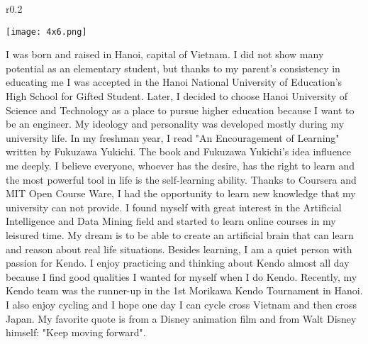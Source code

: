 \documentclass[letterpaper,11pt]{article}
\begin{document}
\begin{minipage}{\textwidth}
\begin{wrapfigure}{r}{0.2\textwidth}
  \vspace{-13pt}
  \begin{center}
    \texttt{[image: 4x6.png]}
  \end{center}
  \vspace{-20pt}
\end{wrapfigure}
\vspace{1em}
I was born and raised in Hanoi, capital of Vietnam. I did not show many potential as an elementary student, but thanks to my parent's consistency in educating me I was accepted in the Hanoi National University of Education's High School for Gifted Student. Later, I decided to choose Hanoi University of Science and Technology as a place to pursue higher education because I want to be an engineer. My ideology and personality was developed mostly during my university life. In my freshman year, I read "An Encouragement of Learning" written by Fukuzawa Yukichi. The book and Fukuzawa Yukichi's idea influence me deeply. I believe everyone, whoever has the desire, has the right to learn and the most powerful tool in life is the self-learning ability. Thanks to Coursera and MIT Open Course Ware, I had the opportunity to learn new knowledge that my university can not provide. I found myself with great interest in the Artificial Intelligence and Data Mining field and started to learn online courses in my leisured time. My dream is to be able to create an artificial brain that can learn and reason about real life situations. Besides learning, I am a quiet person with passion for Kendo. I enjoy practicing and thinking about Kendo almost all day because I find good qualities I wanted for myself when I do Kendo. Recently, my Kendo team was the runner-up in the 1st Morikawa Kendo Tournament in Hanoi. I also enjoy cycling and I hope one day I can cycle cross Vietnam and then cross Japan. My favorite quote is from a Disney animation film and from Walt Disney himself: "Keep moving forward".
\end{minipage}
\end{document}
